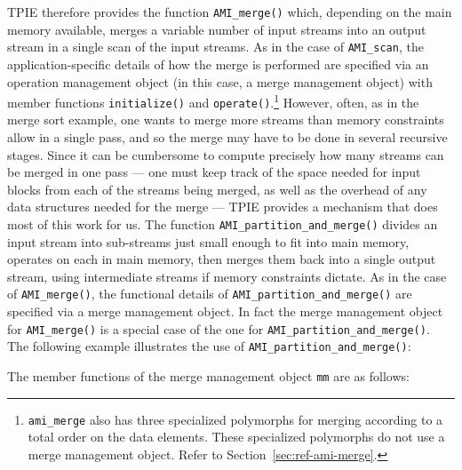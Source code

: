 TPIE therefore provides the function \lstinline|AMI_merge()|
which, depending on the main memory available, merges a
variable number of input streams into an output stream in a
single scan of the input streams. As in the case of
\lstinline|AMI_scan|, the application-specific details of how the merge
is performed are specified via an operation management
object (in this case, a  merge management object)
with member functions \lstinline|initialize()| and
\lstinline|operate()|.\footnote{%
   \lstinline|ami_merge| also has three specialized polymorphs
   for merging according to a total order on the data
   elements. These specialized polymorphs do not use a merge
   management object. Refer to
   Section~\ref{sec:ref-ami-merge}.} 
However, often, as in the merge sort example, one wants to
merge more streams than memory constraints allow in a single
pass, and so the merge may have to be done in several recursive
stages.
Since it can be cumbersome to compute precisely how
many streams can be merged in one pass --- one must keep
track of the space needed for input blocks from each of the
streams being merged, as well as the overhead of any data
structures needed for the merge --- TPIE provides a
mechanism that does most of this work for us. The
function \lstinline|AMI_partition_and_merge()| divides an
input stream into sub-streams just small enough to fit into
main memory, operates on each in main memory, then merges
them back into a single output stream, using intermediate
streams if memory constraints dictate. As in the case of
\lstinline|AMI_merge()|, the functional details of
\lstinline|AMI_partition_and_merge()| are specified via a
merge management object. In fact the merge management object
for \lstinline|AMI_merge()| is a special case of the one for
\lstinline|AMI_partition_and_merge()|. The following example
illustrates the use of \lstinline|AMI_partition_and_merge()|:



The member functions of the merge management object
\lstinline|mm| are as follows:


